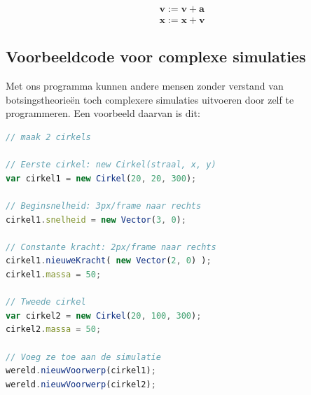 \documentclass[12pt,a4paper]{article}
\begin{document}
	\begin{equation}
		\begin{aligned}
			\mathbf{v} := \mathbf{v} + \mathbf{a} \\
			\mathbf{x} := \mathbf{x} + \mathbf{v}
		\end{aligned}
	\end{equation}
	
	\subsection{Voorbeeldcode voor complexe simulaties}
	Met ons programma kunnen andere mensen zonder verstand van botsingstheorie\"{e}n toch complexere simulaties uitvoeren door zelf te programmeren. Een voorbeeld daarvan is dit:
	
	\begin{lstlisting}[language=Javascript, caption={Vier cirkels, met een kracht op cirkel 1}]
// maak 2 cirkels

// Eerste cirkel: new Cirkel(straal, x, y)
var cirkel1 = new Cirkel(20, 20, 300);

// Beginsnelheid: 3px/frame naar rechts
cirkel1.snelheid = new Vector(3, 0);

// Constante kracht: 2px/frame naar rechts   
cirkel1.nieuweKracht( new Vector(2, 0) ); 
cirkel1.massa = 50;

// Tweede cirkel
var cirkel2 = new Cirkel(20, 100, 300);
cirkel2.massa = 50;

// Voeg ze toe aan de simulatie
wereld.nieuwVoorwerp(cirkel1);
wereld.nieuwVoorwerp(cirkel2);
	\end{lstlisting}
\end{document}
